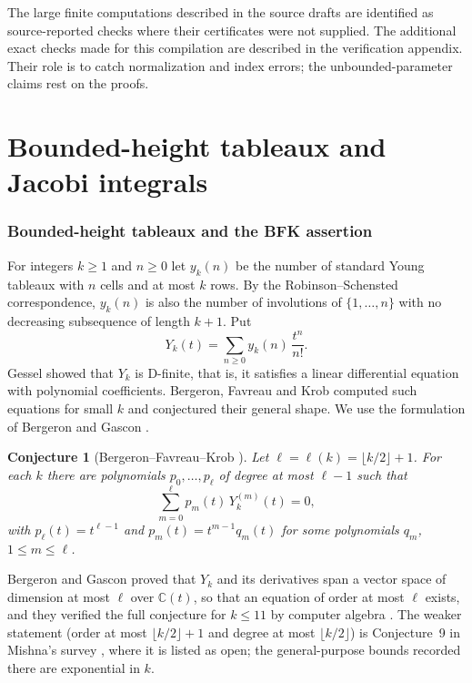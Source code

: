 \documentclass[11pt,a4paper]{article}
\newtheorem{conjecture}[theorem]{Conjecture}
\theoremstyle{definition}
\theoremstyle{remark}
\numberwithin{equation}{section}
\newcommand{\C}{\mathbb{C}}
\newcommand{\fl}[1]{\lfloor #1\rfloor}
\begin{document}
The large finite computations described in the source drafts are identified
as source-reported checks where their certificates were not supplied. The
additional exact checks made for this compilation are described in the
verification appendix. Their role is to catch normalization and index errors;
the unbounded-parameter claims rest on the proofs.

\clearpage
\part{Bounded-height tableaux and Jacobi integrals}\label{part:tableaux}


\section{Bounded-height tableaux and the BFK assertion}

For integers $k\ge 1$ and $n\ge 0$ let $y_k(n)$ be the number of standard Young tableaux with $n$ cells and at most $k$ rows. By the Robinson--Schensted correspondence, $y_k(n)$ is also the number of involutions of $\{1,\dots,n\}$ with no decreasing subsequence of length $k+1$. Put
\[
Y_k(t)=\sum_{n\ge 0}y_k(n)\,\frac{t^n}{n!}.
\]
Gessel \cite{Ges90} showed that $Y_k$ is D-finite, that is, it satisfies a linear differential equation with polynomial coefficients. Bergeron, Favreau and Krob \cite{BFK95} computed such equations for small $k$ and conjectured their general shape. We use the formulation of Bergeron and Gascon \cite{BG00}.

\begin{conjecture}[Bergeron--Favreau--Krob \cite{BFK95,BG00}]\label{bfk:conj:BFK}
Let $\ell=\ell(k)=\fl{k/2}+1$. For each $k$ there are polynomials $p_0,\dots,p_\ell$ of degree at most $\ell-1$ such that
\[
\sum_{m=0}^{\ell}p_m(t)\,Y_k^{(m)}(t)=0,
\]
with $p_\ell(t)=t^{\ell-1}$ and $p_m(t)=t^{m-1}q_m(t)$ for some polynomials $q_m$, $1\le m\le \ell$.
\end{conjecture}

Bergeron and Gascon proved that $Y_k$ and its derivatives span a vector space of dimension at most $\ell$ over $\C(t)$, so that an equation of order at most $\ell$ exists, and they verified the full conjecture for $k\le 11$ by computer algebra \cite{BG00}. The weaker statement (order at most $\fl{k/2}+1$ and degree at most $\fl{k/2}$) is Conjecture~9 in Mishna's survey \cite{Mis19}, where it is listed as open; the general-purpose bounds recorded there are exponential in $k$.
\end{document}
